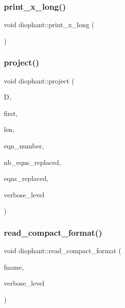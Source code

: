 \subsubsection{\texorpdfstring{print\+\_\+x\+\_\+long()}{print\_x\_long()}}
{\footnotesize\ttfamily void diophant\+::print\+\_\+x\+\_\+long (\begin{DoxyParamCaption}{ }\end{DoxyParamCaption})}

\mbox{\label{classdiophant_abf85557002f360c3e7cb70b546ab2cb3}} 
\subsubsection{\texorpdfstring{project()}{project()}}
{\footnotesize\ttfamily void diophant\+::project (\begin{DoxyParamCaption}\item[{\mbox{\hyperlink{classdiophant}{diophant}} $\ast$}]{D,  }\item[{\mbox{\hyperlink{galois_8h_a09fddde158a3a20bd2dcadb609de11dc}{I\+NT}}}]{first,  }\item[{\mbox{\hyperlink{galois_8h_a09fddde158a3a20bd2dcadb609de11dc}{I\+NT}}}]{len,  }\item[{\mbox{\hyperlink{galois_8h_a09fddde158a3a20bd2dcadb609de11dc}{I\+NT}} $\ast$\&}]{eqn\+\_\+number,  }\item[{\mbox{\hyperlink{galois_8h_a09fddde158a3a20bd2dcadb609de11dc}{I\+NT}} \&}]{nb\+\_\+eqns\+\_\+replaced,  }\item[{\mbox{\hyperlink{galois_8h_a09fddde158a3a20bd2dcadb609de11dc}{I\+NT}} $\ast$\&}]{eqns\+\_\+replaced,  }\item[{\mbox{\hyperlink{galois_8h_a09fddde158a3a20bd2dcadb609de11dc}{I\+NT}}}]{verbose\+\_\+level }\end{DoxyParamCaption})}

\mbox{\label{classdiophant_a8cf43adfae9ea53b58c6388c50bcd368}} 
\subsubsection{\texorpdfstring{read\+\_\+compact\+\_\+format()}{read\_compact\_format()}}
{\footnotesize\ttfamily void diophant\+::read\+\_\+compact\+\_\+format (\begin{DoxyParamCaption}\item[{const \mbox{\hyperlink{galois_8h_ab6cc7b4aeb6ea31aba2b3fbfc83ff5e6}{B\+Y\+TE}} $\ast$}]{fname,  }\item[{\mbox{\hyperlink{galois_8h_a09fddde158a3a20bd2dcadb609de11dc}{I\+NT}}}]{verbose\+\_\+level }\end{DoxyParamCaption})}

